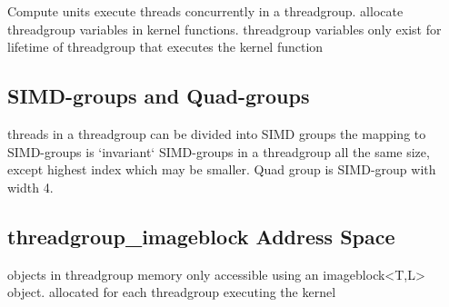 Compute units execute threads concurrently in a threadgroup.
allocate threadgroup variables in kernel functions.
threadgroup variables only exist for lifetime of threadgroup that executes the kernel function

\subsection{SIMD-groups and Quad-groups}

threads in a threadgroup can be divided into SIMD groups
the mapping to SIMD-groups is `invariant`
SIMD-groups in a threadgroup all the same size, except highest index which may be smaller.
Quad group is SIMD-group with width 4.

\subsection{threadgroup_imageblock Address Space}

objects in threadgroup memory only accessible using an imageblock<T,L> object.
allocated for each threadgroup executing the kernel